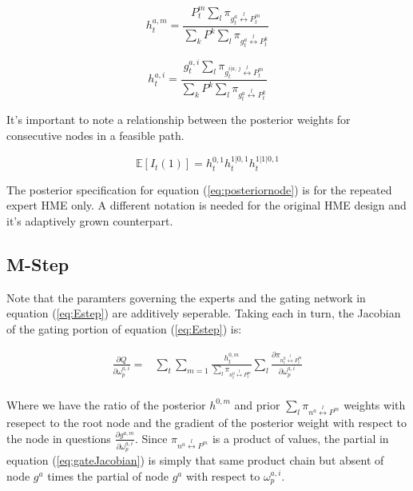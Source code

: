 \documentclass[12pt]{article}
\newcommand{\sumgateprod}[3]{\pi_{#1 \overset{#3}{\longleftrightarrow} #2}}
\newcommand{\shortsum}[1]{\sum \nolimits_{#1}}
\begin{document}
\begin{equation} \label{eq:posteriornode}
  h^{a,m}_{t} = \frac{P^{m}_{t} \shortsum{l} \sumgateprod{g^{a}_{t}}{P^{m}_{t}}{l}}{\sum_{k} P^{k} \shortsum{l} \sumgateprod{g^{a}_{t}}{P^{k}_{t}}{l}}
\end{equation}

\begin{equation} \label{eq:posteriornode2}
  h^{a, i}_{t} = \frac{ g^{a, i}_{t} \shortsum{l} \sumgateprod{g^{i|a, \, j}_{t}}{P^{m}_{t}}{l}}{\sum_{k} P^{k} \shortsum{l} \sumgateprod{g^{a}_{t}}{P^{k}_{t}}{l}}
\end{equation}

It's important to note a relationship between the posterior weights for consecutive
nodes in a feasible path.

\begin{equation} \label{eq:posteriorrelation}
  \mathbb{E}\left[I_{t}(1)\right] = h^{0,1}_{t} h^{1|0,1}_{t} h^{1|1|0,1}_{t}
\end{equation}

The posterior specification for equation (\ref{eq:posteriornode}) is for the
repeated expert HME only. A different notation is needed for the original HME
design and it's adaptively grown counterpart.


\subsection{M-Step}

Note that the paramters governing the experts and the gating network in
equation (\ref{eq:Estep}) are additively seperable. Taking each in turn, the
Jacobian of the gating portion of equation (\ref{eq:Estep}) is:

\begin{equation} \label{eq:gateJacobian}
  \begin{split}
    \frac{\partial Q}{\partial \omega^{a,i}_{p}} =& \sum_{t} \sum_{m=1}  \frac{h^{0,m}_{t}}{\sum_{l} \pi_{n^{0}_{t} \overset{l}{\longleftrightarrow} P^{m}_{t}}} \sum_{l} \frac{\partial \pi_{n^{0}_{t} \overset{l}{\longleftrightarrow} P^{m}_{t}}}{\partial \omega^{a,i}_{p}} \\
  \end{split}
\end{equation}

Where we have the ratio of the posterior $h^{0,m}$ and prior 
$\sum_{l} \pi_{n^{a} \overset{l}{\longleftrightarrow} P^{m}}$ weights with resepect
to the root node and the gradient of the posterior weight with respect to the node
in questions $\frac{\partial g^{a,m}}{\partial \omega^{a,i}_{p}}$. Since
$\pi_{n^{a} \overset{l}{\longleftrightarrow} P^{m}}$ is a product of values, the
partial in equation (\ref{eq:gateJacobian}) is simply that same product chain but
absent of node $g^a$ times the partial of node $g^a$ with respect to
$\omega^{a,i}_{p}$.
\end{document}
